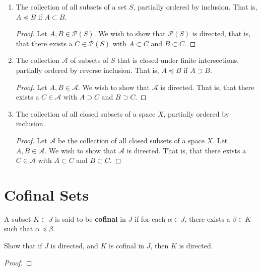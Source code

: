 \documentclass[12pt]{article}
\begin{document}
\begin{enumerate}
	\item The collection of all subsets of a set $S$, partially ordered by inclusion. That is, $A
		      \preceq B$ if $A \subset B$.
	      \begin{proof}
		      Let $A, B \in \mathcal P(S)$. We wish to show that $\mathcal P(S)$ is directed, that
		      is, that there exists a $C \in \mathcal P(S)$ with $A \subset C$ and $B \subset C$.
	      \end{proof}

	\item The collection $\mathcal A$ of subsets of $S$ that is closed under finite intersections,
	      partially ordered by reverse inclusion. That is, $A \preceq B$ if $A \supset B$.
	      \begin{proof}
		      Let $A, B \in \mathcal A$. We wish to show that $\mathcal A$ is directed. That is, that
		      there exists a $C \in \mathcal A$ with $A \supset C$ and $B \supset C$.
	      \end{proof}

	\item The collection of all closed subsets of a space $X$, partially ordered by inclusion.
	      \begin{proof}
		      Let $\mathcal A$ be the collection of all closed subsets of a space $X$. Let $A, B \in
			      \mathcal A$. We wish to show that $\mathcal A$ is directed. That is, that there exists a $C \in
			      \mathcal A$ with $A \subset C$ and $B \subset C$.
	      \end{proof}
\end{enumerate}

\section{Cofinal Sets}
\begin{defn}
	A subset $K \subset J$ is said to be \textbf{cofinal} in $J$ if for each $\alpha \in J$, there
	exists a $\beta \in K$ such that $\alpha \preceq \beta$.
\end{defn}

Show that if $J$ is directed, and $K$ is cofinal in $J$, then $K$ is directed.

\begin{proof}
\end{proof}
\end{document}
